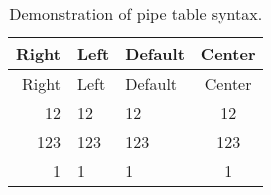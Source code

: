 \documentclass[
]{article}
\begin{document}
\begin{longtable}[]{@{}|r|l|l|c|@{}}
\caption{Demonstration of pipe table syntax.}\tabularnewline
\toprule
Right & Left & Default & Center \\
\midrule
\endfirsthead
\toprule
Right & Left & Default & Center \\
\midrule
\endhead
12 & 12 & 12 & 12 \\

\midrule
123 & 123 & 123 & 123 \\

\midrule
1 & 1 & 1 & 1 \\
\bottomrule
\end{longtable}
\end{document}
